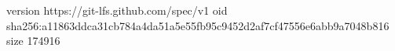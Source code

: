 version https://git-lfs.github.com/spec/v1
oid sha256:a11863ddca31cb784a4da51a5e55fb95c9452d2af7cf47556e6abb9a7048b816
size 174916

